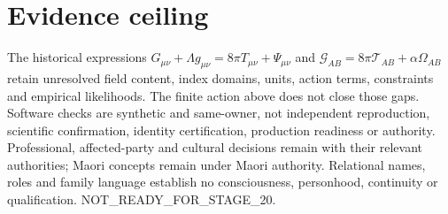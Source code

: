 \documentclass[11pt]{article}
\begin{document}
\section{Evidence ceiling}
The historical expressions $G_{\mu\nu}+\Lambda g_{\mu\nu}=8\pi T_{\mu\nu}+\Psi_{\mu\nu}$ and $\mathcal G_{AB}=8\pi\mathcal T_{AB}+\alpha\Omega_{AB}$ retain unresolved field content, index domains, units, action terms, constraints and empirical likelihoods. The finite action above does not close those gaps. Software checks are synthetic and same-owner, not independent reproduction, scientific confirmation, identity certification, production readiness or authority. Professional, affected-party and cultural decisions remain with their relevant authorities; Maori concepts remain under Maori authority. Relational names, roles and family language establish no consciousness, personhood, continuity or qualification. NOT\_READY\_FOR\_STAGE\_20.
\end{document}
